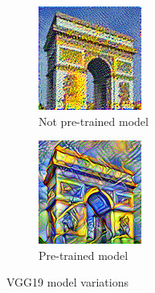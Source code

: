 \documentclass[twocolumn,superscriptaddress,aps, floatfix]{revtex4-1}
\begin{document}
    \begin{figure}[ht]
        \centering
        \begin{subfigure}[b]{0.22\textwidth}
            \centering
            \includegraphics[width=\textwidth]{resources/png/model/sun-trees-paris-notpretrained.png}
            \caption{Not pre-trained model}
        \end{subfigure}
        \hfill
        \begin{subfigure}[b]{0.22\textwidth}
            \centering
            \includegraphics[width=\textwidth]{resources/png/model/sun-trees-paris-pretrained.png}
            \caption{Pre-trained model}
        \end{subfigure}
        \caption{VGG19 model variations}
        \label{fig:model.pretrained.variations}
    \end{figure}
    
\end{document}
